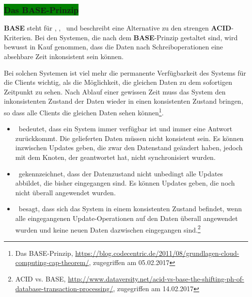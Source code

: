 %

\subsubsection{\colorbox{green}{Das BASE-Prinzip}}\label{base}

\textbf{BASE} steht für \BAse, \baSe, \basE\ und beschreibt eine Alternative zu den strengen \textbf{ACID}-Kriterien.
Bei den Systemen, die nach dem \textbf{BASE}-Prinzip gestaltet sind, wird bewusst in Kauf genommen, dass die Daten nach Schreiboperationen eine absehbare Zeit inkonsistent sein können.

Bei solchen Systemen ist viel mehr die permanente Verfügbarkeit des Systems für die Clients wichtig, als die Möglichkeit, die gleichen Daten zu dem sofortigen Zeitpunkt zu sehen. Nach Ablauf einer gewissen Zeit muss das System den inkonsistenten Zustand der Daten wieder in einen konsistenten Zustand bringen, so dass alle Clients die gleichen Daten sehen können\footnote{Das BASE-Prinzip, \url{https://blog.codecentric.de/2011/08/grundlagen-cloud-computing-cap-theorem/}, zugegriffen am 05.02.2017}.

\begin{itemize}
\item \BAse\ bedeutet, dass ein System immer verfügbar ist und immer eine Antwort zurückkommt. Die gelieferten Daten müssen nicht konsistent sein. Es können inzwischen Updates geben, die zwar den Datenstand geändert haben, jedoch mit dem Knoten, der geantwortet hat, nicht synchronisiert wurden.

\item \baSe\ gekennzeichnet, dass der Datenzustand nicht unbedingt alle Updates abbildet, die bisher eingegangen sind. Es können Updates geben, die noch nicht überall angewendet wurden.

\item \basE\ besagt, dass sich das System in einem konsistenten Zustand befindet, wenn alle eingegangenen Update-Operationen auf den Daten überall angewendet wurden und keine neuen Daten dazwischen eingegangen sind.\footnote{ACID vs. BASE, \url{http://www.dataversity.net/acid-vs-base-the-shifting-ph-of-database-transaction-processing/}, zugegriffen am 14.02.2017}
\end{itemize}

